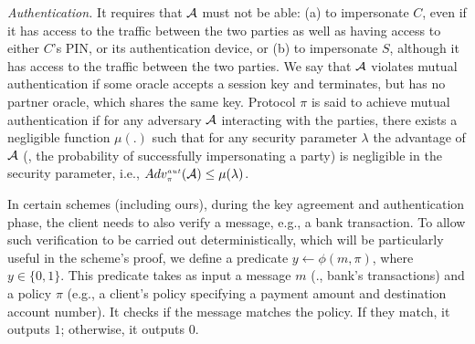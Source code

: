


\noindent\textit{Authentication.} It requires that $\mathcal{A}$ must not be able: (a)  to impersonate $C$, even if it has access to the traffic between the two parties as well as having access to either $C$'s PIN, or its authentication device, or (b) to impersonate  $S$, although it has access to the traffic between the two parties.   We say that   $\mathcal{A}$  violates mutual authentication if some oracle accepts a session key and terminates, but has no partner oracle, which shares the same key.  Protocol $\pi$ is said to achieve mutual authentication if for any adversary $\mathcal{A}$  interacting with the parties, there exists a negligible function $\mu(.)$ such that for any security parameter $\lambda$ the advantage of $\mathcal{A}$ (\ie, the probability of successfully impersonating a party)  is negligible in the security parameter, i.e., 
%
$Adv_{\scriptscriptstyle\pi}^{\scriptscriptstyle aut}(\mathcal{A})\leq \mu(\lambda)$.


In certain schemes (including ours), during the key agreement and authentication phase, the client needs to also verify a message, e.g., a bank transaction. To allow such verification to be carried out deterministically, which will be particularly useful in the scheme's proof, we define a predicate $y\leftarrow \phi(m, \pi)$, where $y\in \{0,1\}$. This predicate takes as input a message $m$ (\eg., bank's transactions) and a policy $\pi$ (e.g., a client's policy specifying a payment amount and destination account number). It checks if the message matches the policy. If they match, it outputs $1$; otherwise, it outputs $0$.  













